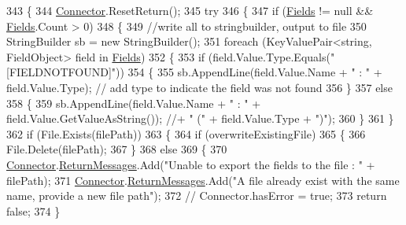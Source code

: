 \begin{DoxyCode}
343     \{
344         \mbox{\hyperlink{class_connector}{Connector}}.ResetReturn();
345         \textcolor{keywordflow}{try}
346         \{
347             \textcolor{keywordflow}{if} (\mbox{\hyperlink{class_document_object_ae203b8a3e40b6c428145d2335b71245c}{Fields}} != null && \mbox{\hyperlink{class_document_object_ae203b8a3e40b6c428145d2335b71245c}{Fields}}.Count > 0)
348             \{
349                 \textcolor{comment}{//write all to stringbuilder, output to file }
350                 StringBuilder sb = \textcolor{keyword}{new} StringBuilder();
351                 \textcolor{keywordflow}{foreach} (KeyValuePair<string, FieldObject> field \textcolor{keywordflow}{in} \mbox{\hyperlink{class_document_object_ae203b8a3e40b6c428145d2335b71245c}{Fields}})
352                 \{
353                     \textcolor{keywordflow}{if} (field.Value.Type.Equals(\textcolor{stringliteral}{"[FIELDNOTFOUND]"}))
354                     \{
355                         sb.AppendLine(field.Value.Name + \textcolor{stringliteral}{" : "} + field.Value.Type); \textcolor{comment}{// add type to indicate
       the field was not found}
356                     \}
357                     \textcolor{keywordflow}{else}
358                     \{
359                         sb.AppendLine(field.Value.Name + \textcolor{stringliteral}{" : "} + field.Value.GetValueAsString()); \textcolor{comment}{//+ " ("
       + field.Value.Type + ")");}
360                     \}
361                 \}
362                 \textcolor{keywordflow}{if} (File.Exists(filePath))
363                 \{
364                     \textcolor{keywordflow}{if} (overwriteExistingFile)
365                     \{
366                         File.Delete(filePath);
367                     \}
368                     \textcolor{keywordflow}{else}
369                     \{
370                         \mbox{\hyperlink{class_connector}{Connector}}.\mbox{\hyperlink{class_connector_a1ed422674b344524fd77998dcf6a9ba6}{ReturnMessages}}.Add(\textcolor{stringliteral}{"Unable to export the fields to
       the file : "} + filePath);
371                         \mbox{\hyperlink{class_connector}{Connector}}.\mbox{\hyperlink{class_connector_a1ed422674b344524fd77998dcf6a9ba6}{ReturnMessages}}.Add(\textcolor{stringliteral}{"A file already exist with the
       same name, provide a new file path"});
372                         \textcolor{comment}{// Connector.hasError = true;}
373                         \textcolor{keywordflow}{return} \textcolor{keyword}{false};
374                     \}

\end{DoxyCode}
